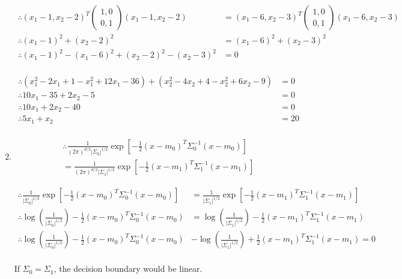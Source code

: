 \begin{enumerate}
		\begin{align*}
    		\therefore (x_{1} - 1, x_{2} - 2)^{T} \begin{pmatrix} 1, 0 \\ 0, 1 \end{pmatrix} (x_{1} - 1, x_{2} - 2) & = (x_{1} - 6, x_{2} - 3)^{T} \begin{pmatrix} 1, 0 \\ 0, 1 \end{pmatrix} (x_{1} - 6, x_{2} - 3) \\
		    \therefore (x_{1} - 1)^{2} + (x_{2} - 2)^{2} & = (x_{1} - 6)^{2} + (x_{2} - 3)^{2} \\
		    \therefore (x_{1} - 1)^{2} -  (x_{1} - 6)^{2} + (x_{2} - 2)^{2} - (x_{2} - 3)^{2} & = 0 \\		    
		\end{align*}	
		
		\begin{align*}
		    \therefore (x_{1}^{2} - 2x_{1} + 1 - x_{1}^{2} + 12x_{1} - 36) + (x_{2}^{2} - 4x_{2} + 4 - x_{2}^{2} + 6x_{2} - 9) & = 0 \\
		    \therefore 10x_{1} - 35 + 2x_{2} - 5 & = 0 \\
		    \therefore 10x_{1} + 2x_{2} - 40 & = 0 \\
		    \therefore 5x_{1} + x_{2} & = 20 \\
		\end{align*}
	
	\item
       \begin{multline*}
            \therefore \frac{1}{(2\pi)^{d / 2} |\Sigma_{0}|^{1 / 2} } \exp{\left[ -\frac{1}{2}(x - m_{0})^{T} \Sigma_{0}^{-1} (x - m_{0}) \right]} \\ = \frac{1}{(2\pi)^{d / 2} |\Sigma_{1}|^{1 / 2} } \exp{\left[ -\frac{1}{2}(x - m_{1})^{T} \Sigma_{1}^{-1} (x - m_{1}) \right]}
        \end{multline*}
        
       \begin{align*}
            \therefore \frac{1}{|\Sigma_{0}|^{1 / 2} } \exp{\left[ -\frac{1}{2}(x - m_{0})^{T} \Sigma_{0}^{-1} (x - m_{0}) \right]} & = \frac{1}{|\Sigma_{1}|^{1 / 2} } \exp{\left[ -\frac{1}{2}(x - m_{1})^{T} \Sigma_{1}^{-1} (x - m_{1}) \right]} \\
            \therefore \log \left( \frac{1}{|\Sigma_{0}|^{1 / 2}} \right) - \frac{1}{2}(x - m_{0})^{T} \Sigma_{0}^{-1} (x - m_{0}) & = \log \left( \frac{1}{|\Sigma_{1}|^{1 / 2}} \right) -\frac{1}{2}(x - m_{1})^{T} \Sigma_{1}^{-1} (x - m_{1}) \\
            \therefore \log \left( \frac{1}{|\Sigma_{0}|^{1 / 2}} \right) - \frac{1}{2}(x - m_{0})^{T} \Sigma_{0}^{-1} (x - m_{0}) & - \log \left( \frac{1}{|\Sigma_{1}|^{1 / 2}} \right) + \frac{1}{2}(x - m_{1})^{T} \Sigma_{1}^{-1} (x - m_{1})  = 0\\
        \end{align*}        
		
		If $\Sigma_{0} = \Sigma_{1}$, the decision boundary would be linear.

\end{enumerate}